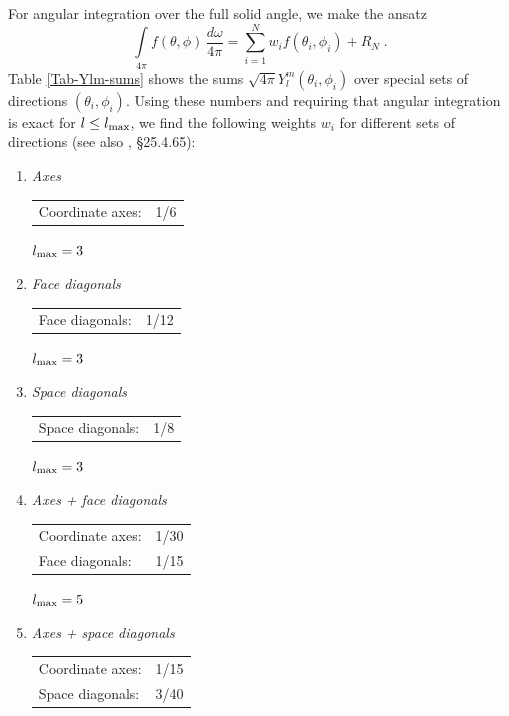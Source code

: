 \documentclass[\mydriver,12pt,twoside,notitlepage,a4paper]{article}
\begin{document}
For angular integration over the full solid angle, we make the ansatz
\begin{equation}
  \int\limits_{4\pi} f(\theta,\phi)\,\frac{d\omega}{4\pi}
  = \sum_{i=1}^{N} w_i f(\theta_i,\phi_i) + R_N \; .
\end{equation}
Table \ref{Tab-Ylm-sums} shows the sums
$\sqrt{4\pi}Y_l^m(\theta_i,\phi_i)$ over special sets of directions
$(\theta_i,\phi_i)$.
Using these numbers and requiring that angular integration is exact for
$l\le l_{\rm max}$, we find the following weights $w_i$ for different sets
of directions (see also \cite{Abramowitz-Stegun}, \S 25.4.65):

\begin{enumerate}
\item \emph{Axes}

  \begin{tabular}{@{}lr}
    Coordinate axes: & 1/6
  \end{tabular}

  $l_{\rm max} = 3$

\item \emph{Face diagonals}

  \begin{tabular}{@{}lr}
    Face diagonals: & 1/12
  \end{tabular}

  $l_{\rm max} = 3$

\item \emph{Space diagonals}

  \begin{tabular}{@{}lr}
    Space diagonals: & 1/8
  \end{tabular}

  $l_{\rm max} = 3$

\item \emph{Axes + face diagonals}

  \begin{tabular}{@{}lr}
    Coordinate axes: & 1/30 \\
    Face diagonals:  & 1/15 \\
  \end{tabular}

  $l_{\rm max} = 5$

\item \emph{Axes + space diagonals}

  \begin{tabular}{@{}lr}
    Coordinate axes: & 1/15 \\
    Space diagonals: & 3/40 \\
  \end{tabular}


\end{enumerate}
\end{document}
